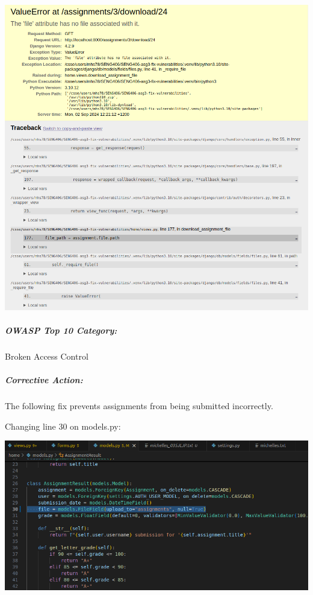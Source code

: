 \begin{center}
    \includegraphics[width = \linewidth]{images/Michelle/noassignment.png}
\end{center}

\subparagraph{OWASP Top 10 Category:}

Broken Access Control

\subparagraph{Corrective Action:}

The following fix prevents assignments from being submitted incorrectly.

Changing line 30 on models.py:

\begin{center}
    \includegraphics[width = \linewidth]{images/Michelle/fileuploadingchanges.png}
\end{center}

